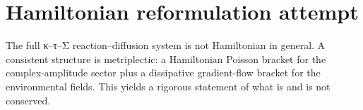 \section{Hamiltonian reformulation attempt}
The full κ–τ–Σ reaction–diffusion system is not Hamiltonian in general.
A consistent structure is metriplectic: a Hamiltonian Poisson bracket for the complex-amplitude sector
plus a dissipative gradient-flow bracket for the environmental fields. This yields a rigorous statement of what is
and is not conserved.
